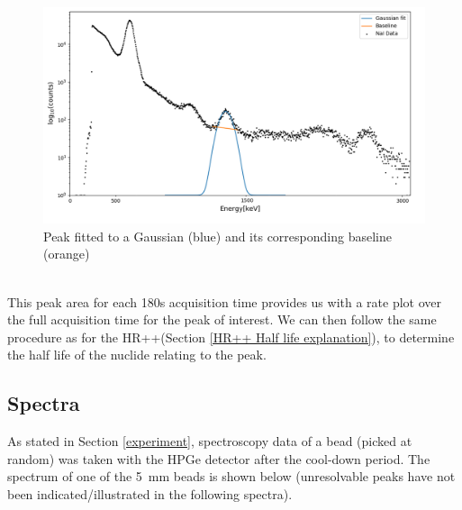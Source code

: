 \documentclass[]{article}
\begin{document}
\begin{figure}[h!]
	\includegraphics[width=12cm]{HL_Explained.png}
	\centering	
	\captionsetup{justification=centering,margin=2cm}
	\caption{Peak fitted to a Gaussian (blue) and its corresponding baseline (orange)}
	\label{fig:HL_expalnation}
\end{figure}~\\
This peak area for each 180s acquisition time provides us with a rate plot over the full acquisition time for the peak of interest. We can then follow the same procedure as for the HR++(Section \ref{HR++ Half life explanation}), to determine the half life of the nuclide relating to the peak.
\subsection{Spectra}
As stated in Section \ref{experiment}, spectroscopy data of a bead (picked at random) was taken with the HPGe detector after the cool-down period. The spectrum of one of the \SI{5}{\milli \metre} beads is shown below (unresolvable peaks have not been indicated/illustrated in the following spectra).\pagebreak
\end{document}
